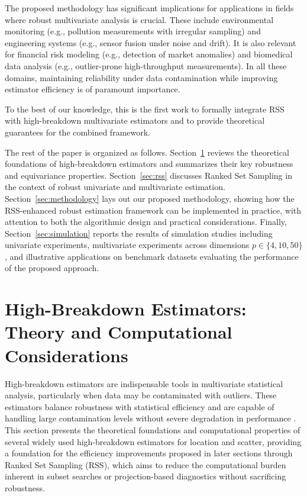 \documentclass[12pt]{article}
\begin{document}
The proposed methodology has significant implications for applications in fields where robust multivariate analysis is crucial. These include environmental monitoring (e.g., pollution measurements with irregular sampling) and engineering systems (e.g., sensor fusion under noise and drift). It is also relevant for financial risk modeling (e.g., detection of market anomalies) and biomedical data analysis (e.g., outlier-prone high-throughput measurements). In all these domains, maintaining reliability under data contamination while improving estimator efficiency is of paramount importance.

To the best of our knowledge, this is the first work to formally integrate RSS with high-breakdown multivariate estimators and to provide theoretical guarantees for the combined framework.


The rest of the paper is organized as follows. Section~\ref{sec:theoretical} reviews the theoretical foundations of high-breakdown estimators and summarizes their key robustness and equivariance properties.
Section~\ref{sec:rss} discusses Ranked Set Sampling in the context of robust univariate and multivariate estimation.
Section~\ref{sec:methodology} lays out our proposed methodology, showing how the RSS-enhanced robust estimation framework can be implemented in practice, with attention to both the algorithmic design and practical considerations.
Finally, Section~\ref{sec:simulation} reports the results of simulation studies including univariate experiments, multivariate experiments across dimensions $p \in \{4, 10, 50\}$, and illustrative applications on benchmark datasets evaluating the performance of the proposed approach.

\section{High-Breakdown Estimators: Theory and Computational Considerations}
\label{sec:theoretical}

High-breakdown estimators are indispensable tools in multivariate statistical analysis, particularly when data may be contaminated with outliers. These estimators balance robustness with statistical efficiency and are capable of handling large contamination levels without severe degradation in performance \cite{zhang2023fast}.
This section presents the theoretical foundations and computational properties of several widely used high-breakdown estimators for location and scatter, providing a foundation for the efficiency improvements proposed in later sections through Ranked Set Sampling (RSS), which aims to reduce the computational burden inherent in subset searches or projection-based diagnostics without sacrificing robustness.
\end{document}
